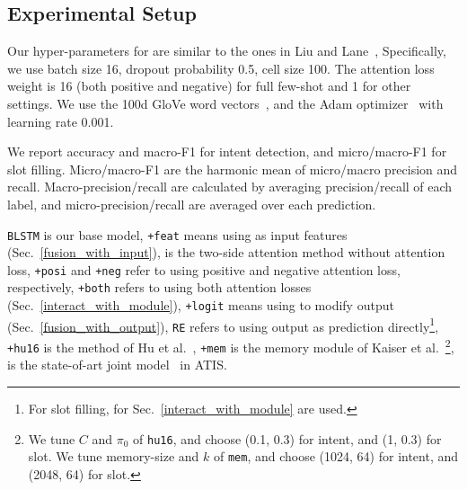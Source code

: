 \subsection{Experimental Setup}
Our hyper-parameters for \BLSTM are similar to the ones in Liu and Lane~,
Specifically, we use batch size 16, dropout probability 0.5, \BLSTM cell size 100.
The attention loss weight is 16 (both positive and negative) for full few-shot and 1 for other settings.
We use the 100d GloVe word vectors~\cite{pennington2014glove}, and the Adam optimizer~\cite{kingma2014adam} with learning rate 0.001.

We report accuracy and macro-F1 for intent detection, and micro/macro-F1 for slot filling.
Micro/macro-F1 are the harmonic mean of micro/macro precision and recall.
Macro-precision/recall are calculated by averaging precision/recall of each label, and micro-precision/recall are averaged over each prediction.

%
\texttt{BLSTM} is our base model,
\texttt{+feat} means using \REtag as input features (Sec.~\ref{fusion_with_input}),
\ptatt is the two-side attention method without attention loss,
\texttt{+posi} and \texttt{+neg} refer to using positive and negative attention loss, respectively, \texttt{+both} refers to using both attention losses (Sec.~\ref{interact_with_module}),
\texttt{+logit} means using \REtag to modify \NN output (Sec.~\ref{fusion_with_output}),
\texttt{RE} refers to using \RE output as prediction directly\footnote{
For slot filling, \REs for Sec.~\ref{interact_with_module} are used.},
\texttt{+hu16} is the method of Hu et al.~,
\texttt{+mem} is the memory module of Kaiser et al.~\footnote{
We tune $C$ and $\pi_0$ of \texttt{hu16}, and choose (0.1, 0.3) for intent, and (1, 0.3) for slot. We tune memory-size and $k$ of \texttt{mem}, and choose (1024, 64) for intent, and (2048, 64) for slot.
},
\LL is the state-of-art joint model~\cite{liu2016attention} in ATIS.